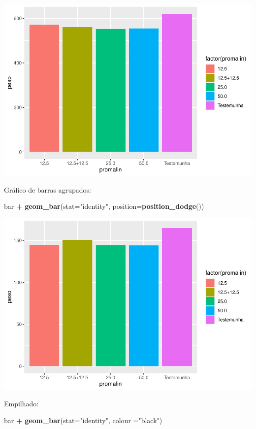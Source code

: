 \documentclass[
]{book}
\newenvironment{Shaded}{\begin{snugshade}}{\end{snugshade}}
\newcommand{\DataTypeTok}[1]{\textcolor[rgb]{0.13,0.29,0.53}{#1}}
\newcommand{\KeywordTok}[1]{\textcolor[rgb]{0.13,0.29,0.53}{\textbf{#1}}}
\newcommand{\NormalTok}[1]{#1}
\newcommand{\OperatorTok}[1]{\textcolor[rgb]{0.81,0.36,0.00}{\textbf{#1}}}
\newcommand{\StringTok}[1]{\textcolor[rgb]{0.31,0.60,0.02}{#1}}
\begin{document}
\includegraphics{TudodoR_files/figure-latex/unnamed-chunk-197-1.pdf}

Gráfico de barras agrupados:

\begin{Shaded}
\begin{Highlighting}[]
\NormalTok{bar }\OperatorTok{+}\StringTok{   }\KeywordTok{geom_bar}\NormalTok{(}\DataTypeTok{stat=}\StringTok{"identity"}\NormalTok{, }\DataTypeTok{position=}\KeywordTok{position_dodge}\NormalTok{())}
\end{Highlighting}
\end{Shaded}

\includegraphics{TudodoR_files/figure-latex/unnamed-chunk-198-1.pdf}

Empilhado:

\begin{Shaded}
\begin{Highlighting}[]
\NormalTok{bar }\OperatorTok{+}\StringTok{   }\KeywordTok{geom_bar}\NormalTok{(}\DataTypeTok{stat=}\StringTok{"identity"}\NormalTok{, }\DataTypeTok{colour =}\StringTok{"black"}\NormalTok{)}
\end{Highlighting}
\end{Shaded}
\end{document}
